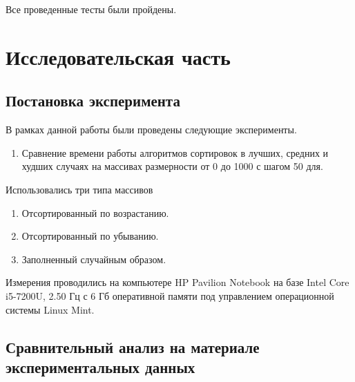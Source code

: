\documentclass[a4paper,14pt]{report}
\begin{document}
Все проведенные тесты были пройдены.

\chapter*{Исследовательская часть}

\section*{Постановка эксперимента}

В рамках данной работы были проведены следующие эксперименты.
\begin{enumerate}
	\item Сравнение времени работы алгоритмов сортировок в лучших, средних и худших случаях на массивах размерности от 0 до 1000 с шагом 50 для.
\end{enumerate}

Использовались три типа массивов
\begin{enumerate}
	\item Отсортированный по возрастанию.
	\item Отсортированный по убыванию.
	\item Заполненный случайным образом.
\end{enumerate}

Измерения проводились на компьютере HP Pavilion Notebook на базе Intel Core i5-7200U, 2.50 Гц с 6 Гб оперативной памяти под управлением операционной системы Linux Mint.

\section*{Сравнительный анализ на материале экспериментальных данных}
\end{document}
